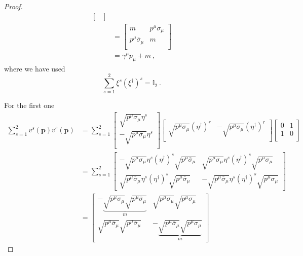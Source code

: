 \begin{proof}
\begin{equation*}
\begin{aligned}
\begin{bmatrix}
            \end{bmatrix} \\ & = \begin{bmatrix}
                m & p^\mu \sigma_\mu \\ p^\mu \overline \sigma_\mu & m \\
            \end{bmatrix} \\ & = \gamma^\mu p_\mu + m ~,
        \end{aligned}
        \end{equation*}
        where we have used 
        \begin{equation*}
            \sum_{s=1}^{2} \xi^s (\xi^\dagger)^s = \mathbb I_2 ~.
        \end{equation*}

        For the first one
        \begin{equation*}
        \begin{aligned}
            \sum_{s=1}^{2} v^s (\mathbf p) \overline v^s(\mathbf p) & = \sum_{s=1}^{2} \begin{bmatrix}
                \sqrt{ p^\mu \sigma_\mu} \eta^s \\ - \sqrt{ p^\mu \overline \sigma_\mu} \eta^s \\
            \end{bmatrix} \begin{bmatrix}
                \sqrt{p^\mu \sigma_\mu} (\eta^\dagger)^r & - \sqrt{p^\mu \overline \sigma_\mu} (\eta^\dagger)^r \\
            \end{bmatrix} \begin{bmatrix}
                0 & 1 \\ 1 & 0 \\
            \end{bmatrix} \\ & = \sum_{s=1}^{2} \begin{bmatrix}
                - \sqrt{p^\mu \sigma_\mu} \eta^s (\eta^\dagger)^s \sqrt{p^\mu \overline \sigma_\mu} & \sqrt{p^\mu \sigma_\mu} \eta^s (\eta^\dagger)^s \sqrt{p^\mu \sigma_\mu} \\ \sqrt{p^\mu \overline \sigma_\mu} \eta^s (\eta^\dagger)^s \sqrt{p^\mu \overline \sigma_\mu} & - \sqrt{p^\mu \overline \sigma_\mu} \eta^s (\eta^\dagger)^s \sqrt{p^\mu \sigma_\mu} 
            \end{bmatrix} \\ & = \begin{bmatrix}
                - \underbrace{\sqrt{p^\mu \sigma_\mu} \sqrt{p^\mu \overline \sigma_\mu}}_m & \sqrt{p^\mu \sigma_\mu} \sqrt{p^\mu \sigma_\mu} \\ \sqrt{p^\mu \overline \sigma_\mu} \sqrt{p^\mu \overline \sigma_\mu} & -\underbrace{\sqrt{p^\mu \overline \sigma_\mu} \sqrt{p^\mu \sigma_\mu}}_m 

\end{bmatrix}
\end{aligned}
\end{equation*}
\end{proof}
